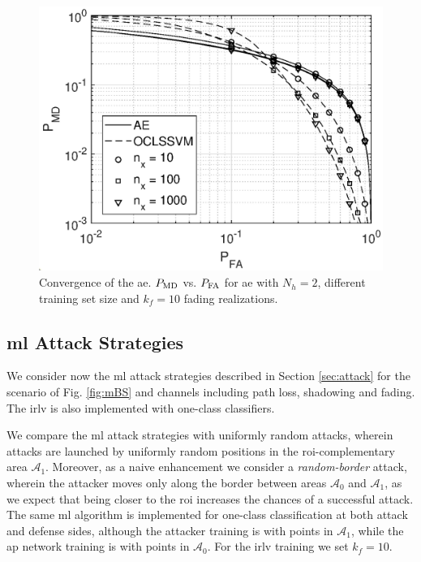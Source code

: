 \documentclass[draftcls,onecolumn,12pt]{IEEEtran}
\begin{document}
\begin{figure}[t]
    \centering
    \includegraphics[width=0.6\columnwidth]{res_avgnTrain_oneClass_kf10.eps}
    \caption{Convergence of the \ac{ae}. $P_{\rm MD}$ vs. $P_{\rm FA}$ for \ac{ae} with $N_h = 2$, different training set size and $k_f=10$ fading realizations.}
    \label{fig:kf10Oc}
\end{figure}

\subsection{\ac{ml} Attack Strategies}

We consider now the \ac{ml} attack strategies described in Section \ref{sec:attack} for the scenario of Fig. \ref{fig:mBS} and channels including path loss, shadowing and fading. The \ac{irlv} is also implemented with one-class classifiers. 


We compare the \ac{ml} attack strategies with uniformly random attacks, wherein attacks are launched by uniformly random positions in the \ac{roi}-complementary area $\mathcal{A}_1$.  Moreover, as a naive enhancement we consider a \emph{random-border} attack, wherein the attacker moves only along the border between areas $\mathcal{A}_0$ and $\mathcal A_1$, as we expect that being closer to the \ac{roi} increases the chances of a successful attack. The same \ac{ml} algorithm is implemented for one-class classification at both attack and defense sides, although the attacker training is with points in $\mathcal A_1$, while the \ac{ap} network training is with points in $\mathcal A_0$. For the \ac{irlv} training we set $k_f=10$.
\end{document}
